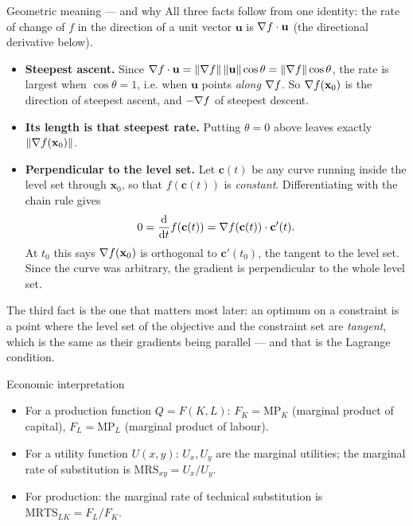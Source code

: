 \begin{rulebox}{Geometric meaning --- and why}
All three facts follow from one identity: the rate of change of $f$ in the
direction of a unit vector $\mathbf{u}$ is $\nabla f\cdot\mathbf{u}$ (the
directional derivative below).
\begin{itemize}[leftmargin=1.6em,itemsep=0.4ex]
  \item \textbf{Steepest ascent.} Since
        $\nabla f\cdot\mathbf{u}=\|\nabla f\|\,\|\mathbf{u}\|\cos\theta
        =\|\nabla f\|\cos\theta$, the rate is largest when $\cos\theta=1$,
        i.e. when $\mathbf{u}$ points \emph{along} $\nabla f$. So
        $\nabla f(\mathbf{x}_0)$ is the direction of steepest ascent, and
        $-\nabla f$ of steepest descent.
  \item \textbf{Its length is that steepest rate.} Putting $\theta=0$ above
        leaves exactly $\|\nabla f(\mathbf{x}_0)\|$.
  \item \textbf{Perpendicular to the level set.} Let $\mathbf{c}(t)$ be any
        curve running inside the level set through $\mathbf{x}_{0}$, so that
        $f(\mathbf{c}(t))$ is \emph{constant}. Differentiating with the
        chain rule gives
        \[
          0=\frac{\mathrm{d}}{\mathrm{d}t}f(\mathbf{c}(t))
           =\nabla f(\mathbf{c}(t))\cdot\mathbf{c}'(t) .
        \]
        At $t_{0}$ this says $\nabla f(\mathbf{x}_{0})$ is orthogonal to
        $\mathbf{c}'(t_{0})$, the tangent to the level set. Since the curve
        was arbitrary, the gradient is perpendicular to the whole level set.
\end{itemize}
The third fact is the one that matters most later: an optimum on a
constraint is a point where the level set of the objective and the
constraint set are \emph{tangent}, which is the same as their gradients
being parallel --- and that is the Lagrange condition.
\end{rulebox}

\begin{rulebox}{Economic interpretation}
\begin{itemize}[leftmargin=1.6em,itemsep=0.3ex]
  \item For a production function $Q=F(K,L)$: $F_K=\mathrm{MP}_K$
        (marginal product of capital), $F_L=\mathrm{MP}_L$ (marginal
        product of labour).
  \item For a utility function $U(x,y)$: $U_x, U_y$ are the marginal
        utilities; the marginal rate of substitution is
        $\mathrm{MRS}_{xy}=U_x/U_y$.
  \item For production: the marginal rate of technical substitution is
        $\mathrm{MRTS}_{LK}=F_L/F_K$.
\end{itemize}
\end{rulebox}

